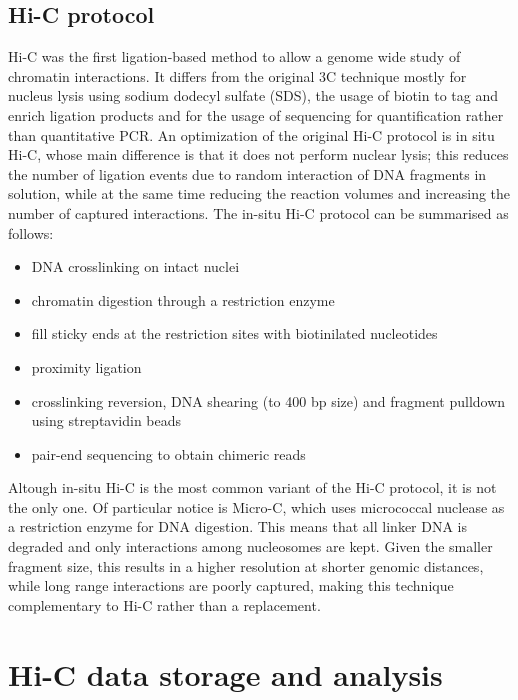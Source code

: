 \subsection{Hi-C protocol}
Hi-C was the first ligation-based method to allow a genome wide study of chromatin interactions. It differs from the original 3C technique mostly for nucleus lysis using sodium dodecyl sulfate (SDS), the usage of biotin to tag and enrich ligation products and for the usage of sequencing for quantification rather than quantitative PCR\cite{hicoriginal2009}. An optimization of the original Hi-C protocol is in situ Hi-C, whose main difference is that it does not perform nuclear lysis; this reduces the number of ligation events due to random interaction of DNA fragments in solution, while at the same time reducing the reaction volumes and increasing the number of captured interactions\cite{insituhic2014}. The in-situ Hi-C protocol can be summarised as follows:

\begin{itemize}\tightlist
  \item DNA crosslinking on intact nuclei
  \item chromatin digestion through a restriction enzyme
  \item fill sticky ends at the restriction sites with biotinilated nucleotides
  \item proximity ligation
  \item crosslinking reversion, DNA shearing (to 400 bp size) and fragment pulldown using streptavidin beads
  \item pair-end sequencing to obtain chimeric reads
\end{itemize}
 
Altough in-situ Hi-C is the most common variant of the Hi-C protocol, it is not the only one. Of particular notice is Micro-C\cite{microc2015}, which uses micrococcal nuclease as a restriction enzyme for DNA digestion. This means that all linker DNA is degraded and only interactions among nucleosomes are kept. Given the smaller fragment size, this results in a higher resolution at shorter genomic distances, while long range interactions are poorly captured, making this technique complementary to Hi-C rather than a replacement.


\section{Hi-C data storage and analysis}

